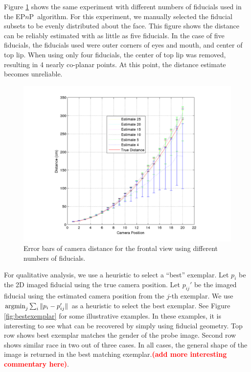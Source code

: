 \documentclass[runningheads]{llncs}
\newcommand{\argmin}{\operatornamewithlimits{argmin}}
\newcommand {\afbnote} [1] {{\bf \textcolor{red}{(#1)}}}
\newcommand {\EPnP} {EP$n$P}
\begin{document}
Figure \ref{fig:error_bar_frontal_lessfiducials} shows the same experiment with different numbers of fiducials used in the \EPnP~algorithm.  For this experiment, we manually selected the fiducial subsets to be evenly distributed about the face.  This figure shows the distance can be reliably estimated with as little as five fiducials.  In the case of five fiducials, the fiducials used were outer corners of eyes and mouth, and center of top lip.  When using only four fiducials, the center of top lip was removed, resulting in 4 nearly co-planar points.  At this point, the distance estimate becomes unreliable.

\begin{figure}[h]
\centering
\includegraphics[width=.8\linewidth]{resources/figures/errorbar_frontal_lessfiducials.png}
\caption{Error bars of camera distance for the frontal view using different numbers of fiducials.}
\label{fig:error_bar_frontal_lessfiducials}
\end{figure}

For qualitative analysis, we use a heuristic to select a ``best'' exemplar.  Let $p_i$ be the 2D imaged fiducial using the true camera position.  
Let $p_{ij}'$ be the imaged fiducial using the estimated camera position from the $j$-th exemplar.
We use $\argmin_j \sum_i \|p_i - p_{ij}'\|$ as a heuristic to select the best exemplar. 
See Figure \ref{fig:bestexemplar} for some illustrative examples.  
In these examples, it is interesting to see what can be recovered by simply using fiducial geometry.  
Top row shows best exemplar matches the gender of the probe image.  
Second row shows similar race in two out of three cases.  
In all cases, the general shape of the image is returned in the best matching exemplar.\afbnote{add more interesting commentary here}.
\end{document}
